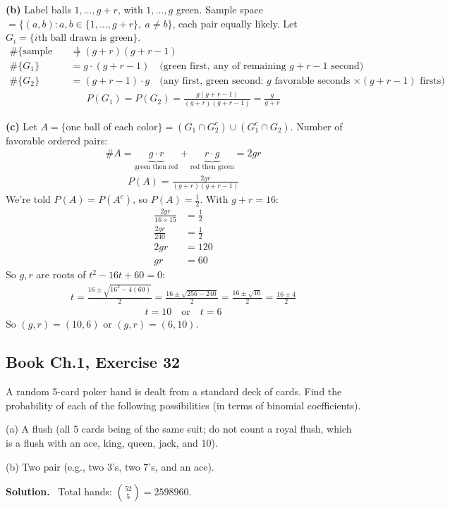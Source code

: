\documentclass[11pt]{article}
\newcommand{\Sol}{\vspace{2pt}\noindent\textbf{Solution.}\ }
\begin{document}
\textbf{(b)} Label balls $1,\dots,g+r$, with $1,\dots,g$ green. Sample space $=\{(a,b): a,b\in\{1,\dots,g+r\},\ a\ne b\}$, each pair equally likely. Let $G_i=\{i\text{th ball drawn is green}\}$.
\begin{align*}
\#\{\text{sample space}\} &= (g+r)(g+r-1)\\
\#\{G_1\} &= g\cdot(g+r-1) \quad\text{(green first, any of remaining $g+r-1$ second)}\\
\#\{G_2\} &= (g+r-1)\cdot g \quad\text{(any first, green second: $g$ favorable seconds $\times(g+r-1)$ firsts)}
\end{align*}
\begin{align*}
P(G_1)=P(G_2) = \frac{g(g+r-1)}{(g+r)(g+r-1)} = \frac{g}{g+r}
\end{align*}

\textbf{(c)} Let $A=\{$one ball of each color$\}=(G_1\cap G_2^c)\cup(G_1^c\cap G_2)$. Number of favorable ordered pairs:
\begin{align*}
\#A = \underbrace{g\cdot r}_{\text{green then red}} + \underbrace{r\cdot g}_{\text{red then green}} = 2gr
\end{align*}
\begin{align*}
P(A) = \frac{2gr}{(g+r)(g+r-1)}
\end{align*}
We're told $P(A)=P(A^c)$, so $P(A)=\tfrac12$. With $g+r=16$:
\begin{align*}
\frac{2gr}{16\times 15} &= \frac12\\
\frac{2gr}{240} &= \frac12\\
2gr &= 120\\
gr &= 60
\end{align*}
So $g,r$ are roots of $t^2-16t+60=0$:
\begin{align*}
t = \frac{16\pm\sqrt{16^2-4(60)}}{2} = \frac{16\pm\sqrt{256-240}}{2} = \frac{16\pm\sqrt{16}}{2} = \frac{16\pm4}{2}
\end{align*}
\begin{align*}
t = 10 \quad\text{or}\quad t=6
\end{align*}
So $(g,r)=(10,6)$ or $(g,r)=(6,10)$.

\subsection{Book Ch.1, Exercise 32}
\begin{qbox}
A random 5-card poker hand is dealt from a standard deck of cards. Find the probability of each of the following possibilities (in terms of binomial coefficients).

(a) A flush (all 5 cards being of the same suit; do not count a royal flush, which is a flush with an ace, king, queen, jack, and 10).

(b) Two pair (e.g., two 3's, two 7's, and an ace).
\end{qbox}
\Sol
Total hands: $\binom{52}{5}=2598960$.
\end{document}

